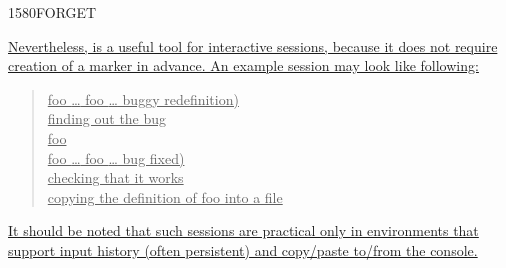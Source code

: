 \begin{worddef}{1580}{FORGET}
\begin{rationale}
	\uline{%
		Nevertheless,  is a useful tool for interactive sessions,
		because it does not require creation of a marker in advance.  An example
		session may look like following:}

		\begin{quote}
			\uline{\word{:} foo {\ldots} foo {\ldots}  buggy redefinition) \word{;}} \\
			\uline{finding out the bug} \\
			\uline{ foo} \\
			\uline{\word{:} foo {\ldots} foo {\ldots}  bug fixed) \word{;}} \\
			\uline{checking that it works} \\
			\uline{copying the definition of foo into a file}
		\end{quote}
      
	\uline{%
		It should be noted that such sessions are practical only in
		environments that support input history (often persistent) and
		copy/paste to/from the console.}
\cbend
	\end{rationale}
\end{worddef}


